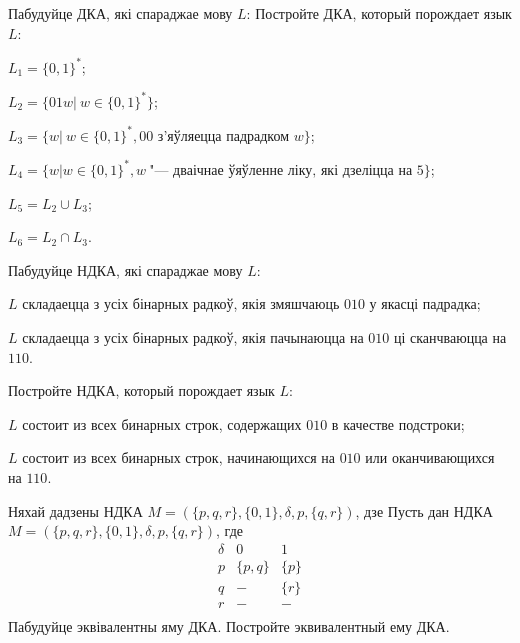 \documentclass[12pt, a4paper]{article}
\begin{document}
\begin{problemList}
\problemItemWithCommonPart
{Пабудуйце ДКА, які спараджае мову $L$:}
{Постройте ДКА, который порождает язык $L$:}
{%
\begin{belarusianEnumerate}
    \item $L_1=\{0, 1\}^*$;
    \item $L_2=\{01w|\ w\in\{0, 1\}^*\}$;
    \item $L_3=\{w|\ w\in\{0, 1\}^*, 00 \text{ з'яўляецца падрадком }w\}$;
    \item $L_4=\{w|w\in\{0, 1\}^*, w\ \text{"--- дваічнае ўяўленне ліку, які дзеліцца на 5}\}$;
    \item $L_5=L_2\cup L_3$;
    \item $L_6=L_2\cap L_3$.
\end{belarusianEnumerate}
}

\smallskip

\problemItemSimple
{%
Пабудуйце НДКА, які спараджае мову $L$:
\begin{belarusianEnumerate}
    \item $L$ складаецца з усіх бінарных радкоў, якія змяшчаюць $010$ у якасці падрадка;
    \item $L$ складаецца з усіх бінарных радкоў, якія пачынаюцца на $010$ ці сканчваюцца на $110$.
\end{belarusianEnumerate}
}
{%
Постройте НДКА, который порождает язык $L$:
\begin{russianEnumerate}
    \item $L$ состоит из всех бинарных строк, содержащих $010$ в качестве подстроки;
    \item $L$ состоит из всех бинарных строк, начинающихся на $010$ или оканчивающихся на $110$.
\end{russianEnumerate}
}

\bigskip

\problemItemWithCommonPartComplicated
{Няхай дадзены НДКА $M=(\{p, q, r\}, \{0, 1\}, \delta, p, \{q, r\})$, дзе}
{Пусть дан НДКА $M=(\{p, q, r\}, \{0, 1\}, \delta, p, \{q, r\})$, где}
{%
\[
\begin{matrix}
\delta & 0 & 1 \\
p & \{p, q\} & \{p\} \\
q & - & \{r\} \\
r & - & - \\
\end{matrix}
\]
}
{Пабудуйце эквівалентны яму ДКА.}
{Постройте эквивалентный ему ДКА.}

\bigskip


\end{problemList}
\end{document}
